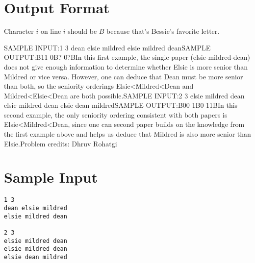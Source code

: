 \documentclass[12pt]{article}
\begin{document}
\section*{Output Format}
Character $i$ on line $i$ should be $B$ because that's Bessie's favorite letter.

SAMPLE INPUT:1 3
dean elsie mildred
elsie mildred deanSAMPLE OUTPUT:B11
0B?
0?BIn this first example, the single paper (elsie-mildred-dean) does not give 
enough information to determine whether Elsie is more senior than Mildred or
vice versa.  However, one can deduce that Dean must be more senior than both, so
the seniority orderings Elsie<Mildred<Dean and Mildred<Elsie<Dean are both
possible.SAMPLE INPUT:2 3
elsie mildred dean
elsie mildred dean
elsie dean mildredSAMPLE OUTPUT:B00
1B0
11BIn this second example, the only seniority ordering consistent with both papers
is Elsie<Mildred<Dean, since one can second paper builds on the knowledge  from
the first example above and helps us deduce that Mildred is also more senior than
Elsie.Problem credits: Dhruv Rohatgi

\section*{Sample Input}
\begin{verbatim}
1 3
dean elsie mildred
elsie mildred dean

2 3
elsie mildred dean
elsie mildred dean
elsie dean mildred
\end{verbatim}
\end{document}
